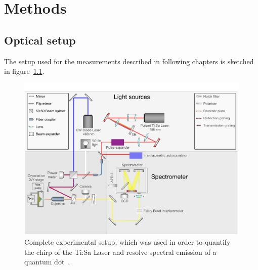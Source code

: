 \chapter{Methods}



\section{Optical setup}

The setup used for the measurements described in following chapters is sketched in figure~\ref{fig:setupflat}.

\begin{figure}[H]
	\centering
	\includegraphics[width=\linewidth]{figures/setup/Setup_flat}
	\caption[Complete experimental setup]{Complete experimental setup, which was used in order to quantify the chirp of the Ti:Sa Laser and resolve spectral emission of a quantum dot~\cite{schimpf_towards_2017}.}
	\label{fig:setupflat}
\end{figure}


